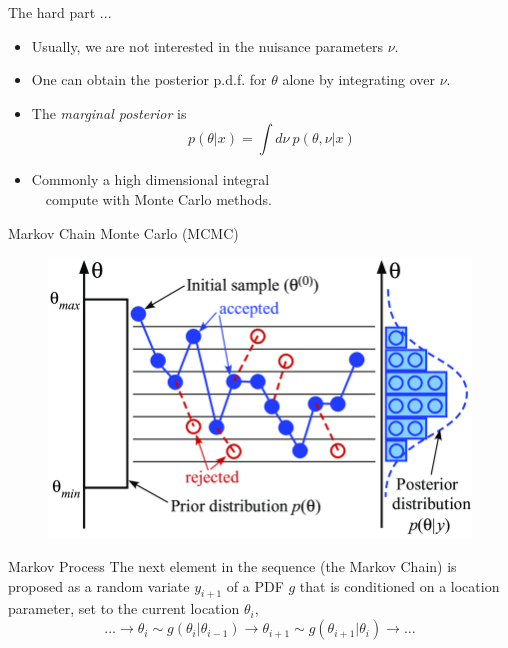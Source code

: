 \documentclass[
aspectratio=169,
14pt,
professionalfonts
]{beamer}
\newcommand{\arrow}{~\ding{220}~}
\begin{document}
\begin{frame}{The hard part ...}
\begin{itemize}
    \item Usually, we are not interested in the nuisance parameters $\nu$.
    \item One can obtain the posterior p.d.f. for $\theta$ alone by integrating over $\nu$.
    \item The \textit{marginal posterior} is
        $$
        p(\theta | x) = \int d\nu ~ p(\theta, \nu | x)
        $$
    \item Commonly a high dimensional integral\\ \arrow compute with Monte Carlo methods.
\end{itemize}
\end{frame}

\begin{frame}{Markov Chain Monte Carlo (MCMC)}
    \begin{figure}
        \centering
        \includegraphics[width=0.6\linewidth]{../plots/mcmc_diagram.png}
    \end{figure}
\end{frame}

\begin{frame}{Markov Process}
    The next element in the sequence (the Markov Chain) is proposed as a random variate $y_{i + 1}$ of a PDF $g$ that is conditioned on a location parameter, set to the current location $\theta_i$,
    $$
    \ldots \to \theta_{i} \sim g(\theta_{i} | \theta_{i-1}) \to \theta_{i+1} \sim g(\theta_{i+1} | \theta_{i}) \to \ldots
    $$
\end{frame}
\end{document}
